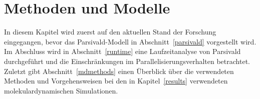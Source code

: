 \chapter{Methoden und Modelle}
\label{models}

In diesem Kapitel wird zuerst auf den aktuellen Stand der Forschung eingegangen, bevor das Parsivald-Modell in Abschnitt~\ref{parsivald} vorgestellt wird.
Im Abschluss wird in Abschnitt~\ref{runtime} eine Laufzeitanalyse von Parsivald durchgeführt und die Einschränkungen im Parallelisierungsverhalten betrachtet.
Zuletzt gibt Abschnitt~\ref{mdmethods} einen Überblick über die verwendeten Methoden und Vorgehensweisen bei den in Kapitel~\ref{results} verwendeten molekulardynamischen Simulationen.


\clearpage

\clearpage

\clearpage

